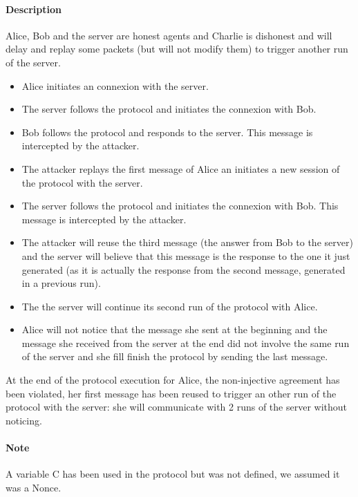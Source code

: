 \documentclass[10pt,a4paper]{article}
\begin{document}
\paragraph{Description}
Alice, Bob and the server are honest agents and Charlie is dishonest and will delay and replay some packets (but will not modify them) to trigger another run of the server.
\begin{itemize}
 \item Alice initiates an connexion with the server.
 \item The server follows the protocol and initiates the connexion with Bob.
 \item Bob follows the protocol and responds to the server. This message is intercepted by the attacker.
 \item The attacker replays the first message of Alice an initiates a new session of the protocol with the server.
 \item The server follows the protocol and initiates the connexion with Bob. This message is intercepted by the attacker.
 \item The attacker will reuse the third message (the answer from Bob to the server) and the server will believe that this message is the response to the one it just generated (as it is actually the response from the second message, generated in a previous run).
 \item The the server will continue its second run of the protocol with Alice.
 \item Alice will not notice that the message she sent at the beginning and the message she received from the server at the end did not involve the same run of the server and she fill finish the protocol by sending the last message.
\end{itemize}

At the end of the protocol execution for Alice, the non-injective agreement has been violated, her first message has been reused to trigger an other run of the protocol with the server: she will communicate with 2 runs of the server without noticing.

\paragraph{Note}
A variable C has been used in the protocol but was not defined, we assumed it was a Nonce.
\end{document}
